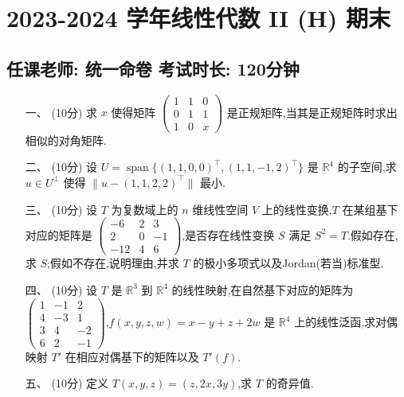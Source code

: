 \documentclass{ctexbook}
\begin{document}
\centering
\section*{2023-2024 学年线性代数 II (H) 期末}
\subsection*{任课老师: 统一命卷 \hfil 考试时长: 120分钟}

\begin{enumerate}[leftmargin=*, labelwidth=!, labelsep=0pt]
    \item[一、 (10分) ]
    求 $x$ 使得矩阵 $\left(
    \begin{array}{ccc}
        1 & 1 & 0 \\
        0 & 1 & 1 \\
        1 & 0 & x
    \end{array}
    \right)$ 是正规矩阵,当其是正规矩阵时求出相似的对角矩阵.

    \item[二、 (10分) ]
    设 $U = \operatorname{span}\{(1,1,0,0)^\top,(1,1,-1,2)^\top\}$ 是 $\mathbb{R}^4$ 的子空间,求 $u \in U^\perp$ 使得 $\|u - (1,1,2,2)^\top\|$ 最小.

    \item[三、 (10分) ]
    设 $T$ 为复数域上的 $n$ 维线性空间 $V$ 上的线性变换,$T$ 在某组基下对应的矩阵是 $\left(
    \begin{array}{ccc}
        -6 & 2 & 3 \\
        2 & 0 & -1 \\
        -12 & 4 & 6
    \end{array}
    \right)$,是否存在线性变换 $S$ 满足 $S^2 = T$.假如存在,求 $S$;假如不存在,说明理由,并求 $T$ 的极小多项式以及Jordan(若当)标准型.

    \item[四、 (10分) ]
    设 $T$ 是 $\mathbb{R}^3$ 到 $\mathbb{R}^4$ 的线性映射,在自然基下对应的矩阵为 $\left(
    \begin{array}{ccc}
        1 & -1 & 2 \\
        4 & -3 & 1 \\
        3 & 4 & -2 \\
        6 & 2 & -1
    \end{array}
    \right)$,$f(x,y,z,w) = x - y + z + 2w$ 是 $\mathbb{R}^4$ 上的线性泛函,求对偶映射 $T'$ 在相应对偶基下的矩阵以及 $T'(f)$.

    \item[五、 (10分) ]
    定义 $T(x,y,z) = (z,2x,3y)$,求 $T$ 的奇异值.


\end{enumerate}
\end{document}
